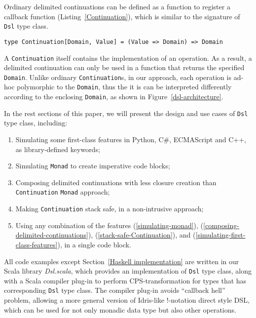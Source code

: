 Ordinary delimited continuations \cite{Danvy89afunctional} can be defined as a function to register a callback function (Listing~\ref{Continuation}), which is similar to the signature of \lstinline{Dsl} type class.

\begin{lstlisting}[caption={The definition of a delimited continuation},label={Continuation}]
type Continuation[Domain, Value] = (Value => Domain) => Domain
\end{lstlisting}

A \lstinline{Continuation} itself contains the implementation of an operation. As a result, a delimited continuation can only be used in a function that returns the specified \lstinline{Domain}. Unlike ordinary \lstinline{Continuation}s, in our approach, each operation is ad-hoc polymorphic to the \lstinline{Domain}, thus the it is can be interpreted differently according to the enclosing \lstinline{Domain}, as shown in Figure~\ref{dsl-architecture}.

In the rest sections of this paper, we will present the design and use cases of \lstinline{Dsl} type class, including:

\begin{enumerate}
  \item Simulating some first-class features in Python, C\#, ECMAScript and C++, as library-defined keywords;
  \label{simulating-first-class-features}

  \item Simulating \lstinline{Monad} to create imperative code blocks;
  \label{simulating-monad}

  \item Composing delimited continuations with less closure creation than \lstinline{Continuation} \lstinline{Monad} approach;
  \label{composing-delimited-continuations}

  \item Making \lstinline{Continuation} stack safe, in a non-intrusive approach;
  \label{stack-safe-Continuation}

  \item Using any combination of the features (\ref{simulating-monad}), (\ref{composing-delimited-continuations}), (\ref{stack-safe-Continuation}), and (\ref{simulating-first-class-features}), in a single code block.
\end{enumerate}

All code examples except Section~\ref{Haskell implementation} are written in our Scala library \textit{Dsl.scala}, which provides an implementation of \lstinline{Dsl} type class, along with a Scala compiler plug-in to perform CPS-transformation for types that has corresponding \lstinline{Dsl} type class. The compiler plug-in avoids ``callback hell'' problem, allowing a more general version of Idris-like !-notation \cite{brady2013idris} direct style DSL, which can be used for not only monadic data type but also other operations.

